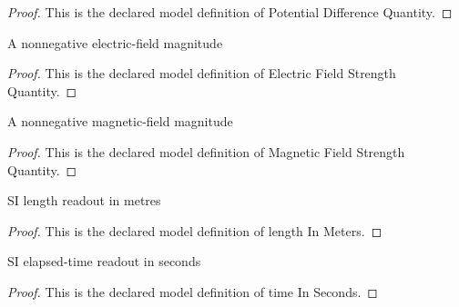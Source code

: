 \begin{proof}
  This is the declared model definition of Potential Difference Quantity.
\end{proof}
\begin{definition}
  \label{def:physics:phyx-mini-0640:phyxminiproblems-problemphyxmini0640-electricfieldstrengthquantity}
  A nonnegative electric-field magnitude
\end{definition}
\begin{proof}
  This is the declared model definition of Electric Field Strength Quantity.
\end{proof}
\begin{definition}
  \label{def:physics:phyx-mini-0640:phyxminiproblems-problemphyxmini0640-magneticfieldstrengthquantity}
  A nonnegative magnetic-field magnitude
\end{definition}
\begin{proof}
  This is the declared model definition of Magnetic Field Strength Quantity.
\end{proof}
\begin{definition}
  \label{def:physics:phyx-mini-0640:phyxminiproblems-problemphyxmini0640-lengthinmeters}
  SI length readout in metres
\end{definition}
\begin{proof}
  This is the declared model definition of length In Meters.
\end{proof}
\begin{definition}
  \label{def:physics:phyx-mini-0640:phyxminiproblems-problemphyxmini0640-timeinseconds}
  SI elapsed-time readout in seconds
\end{definition}
\begin{proof}
  This is the declared model definition of time In Seconds.
\end{proof}
